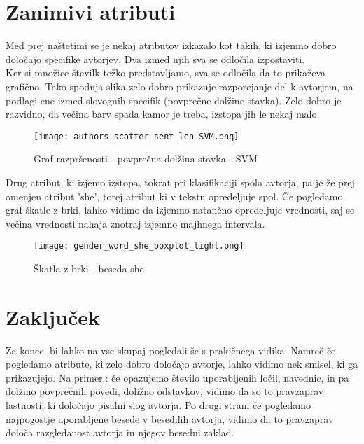 \documentclass[a4paper,11pt]{article}
\begin{document}
\section{Zanimivi atributi}

Med prej naštetimi se je nekaj atributov izkazalo kot takih, ki izjemno dobro določajo specifike avtorjev. 
Dva izmed njih sva se odločila izpostaviti.\\

Ker si množice številk težko predstavljamo, sva se odločila da to prikaževa grafično. Tako spodnja slika zelo dobro 
prikazuje razporejanje del k avtorjem, na podlagi ene izmed slovognih specifik (povprečne dolžine stavka). 
Zelo dobro je razvidno, da večina barv spada kamor je treba, izstopa jih le nekaj malo.

\begin{figure}[H]
\begin{center}
  \texttt{[image: authors\_scatter\_sent\_len\_SVM.png]}
  \caption{Graf razpršenosti - povprečna dolžina stavka - SVM}
  \label{slika8}
\end{center}
\end{figure}

Drug atribut, ki izjemo izstopa, tokrat pri klasifikaciji spola avtorja, pa je že prej omenjen atribut 'she', torej atribut ki v tekstu 
opredeljuje spol. Če pogledamo graf škatle z brki, lahko vidimo da izjemno natančno opredeljuje vrednosti, saj se večina vrednosti 
nahaja znotraj izjemno majhnega intervala.

\begin{figure}[H]
\begin{center}
\centering
  \texttt{[image: gender\_word\_she\_boxplot\_tight.png]}
  \caption{Škatla z brki - beseda she}
  \label{slika9}
\end{center}
\end{figure}

\section{Zaključek}

Za konec, bi lahko na vse skupaj pogledali še s prakičnega vidika. Namreč če pogledamo atribute, ki zelo dobro določajo 
avtorje, lahko vidimo nek smisel, ki ga prikazujejo. Na primer.: če opazujemo število uporabljenih ločil, navednic, in pa 
dolžino povprečnih povedi, doližno odstavkov, vidimo da so to pravzaprav lastnosti, ki določajo pisalni slog avtorja.
Po drugi strani če pogledamo najpogostje uporabljene besede v besedilih avtorja, vidimo da to pravzaprav določa razgledanost 
avtorja in njegov besedni zaklad.
\end{document}

